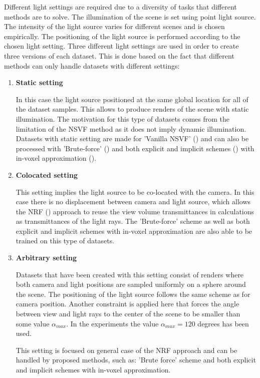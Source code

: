 Different light settings are required due to a diversity of tasks that different methods are to solve.
The illumination of the scene is set using point light source.
The intensity of the light source varies for different scenes and is chosen empirically.
The positioning of the light source is performed according to the chosen light setting.
Three different light settings are used in order to create three versions of each dataset.
This is done based on the fact that different methods can only handle datasets with different settings:
\begin{enumerate}
    \item \textbf{Static setting}
    
    In this case the light source positioned at the same global location for all of the dataset samples.
    This allows to produce renders of the scene with static illumination.
    The motivation for this type of datasets comes from the limitation of the NSVF method
    as it does not imply dynamic illumination.
    Datasets with static setting are made for 'Vanilla NSVF' (\cite{liu2021neural})
    and can also be processed with 'Brute-force' ()
    and both explicit and implicit schemes ()
    with in-voxel approximation ().
    
    \item \textbf{Colocated setting}
    
    This setting implies the light source to be co-located with the camera.
    In this case there is no displacement between camera and light source,
    which allows the NRF (\cite{bi2020neural}) approach to reuse the view volume transmittances
    in calculations as transmittances of the light rays.
    The 'Brute-force' scheme as well as both explicit and implicit schemes
    with in-voxel approximation are also able to be trained on this type of datasets.
    
    \item \textbf{Arbitrary setting}
    
    Datasets that have been created with this setting consist of renders
    where both camera and light positions are sampled uniformly on a sphere around the scene.
    The positioning of the light source follows the same scheme as for camera position.
    Another constraint is applied here that forces the angle
    between view and light rays to the center of the scene to be smaller
    than some value $\alpha_{max}$.
    In the experiments the value $\alpha_{max} = 120$ degrees has been used.
    
    This setting is focused on general case of the NRF approach
    and can be handled by proposed methods, such as: 'Brute force' scheme
    and both explicit and implicit schemes with in-voxel approximation.
\end{enumerate}




